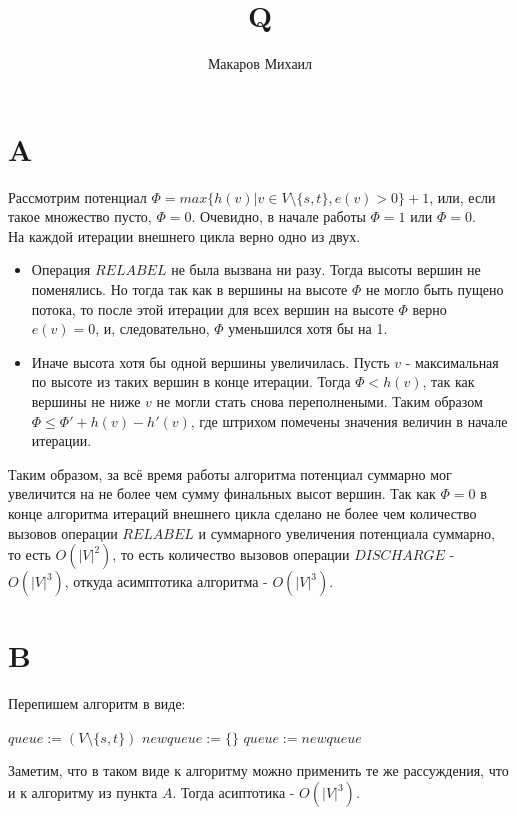 \documentclass{article}
\title{Q}
\author{Макаров Михаил}
\date{}
\begin{document}
	\maketitle
	\section{A}
    Рассмотрим потенциал $\Phi = max \{ h(v)| v \in V \setminus \{ s, t \}, e(v) > 0 \} + 1$, или, если
    такое множество пусто, $\Phi = 0$.
    Очевидно, в начале работы $\Phi = 1$ или $\Phi = 0$.\\
    На каждой итерации внешнего цикла верно одно из двух.
    \begin{itemize}
    \item Операция $RELABEL$ не была вызвана ни разу.
    Тогда высоты вершин не поменялись. Но тогда так как в вершины на высоте $\Phi$ не могло быть пущено потока,
    то после этой итерации для всех вершин на высоте $\Phi$ верно $e(v) = 0$, и, следовательно, 
    $\Phi$ уменьшился хотя бы на 1.
    \item Иначе высота хотя бы одной вершины увеличилась. Пусть $v$ - максимальная по высоте из таких вершин
    в конце итерации. Тогда $\Phi < h(v)$, так как вершины не ниже $v$ не могли стать снова переполнеными.
    Таким образом $\Phi \leq \Phi' + h(v) - h'(v)$, где штрихом помечены значения величин в начале итерации.
    \end{itemize}
    Таким образом, за всё время работы алгоритма потенциал суммарно мог увеличится на не более чем сумму финальных
    высот вершин. Так как $\Phi = 0$ в конце алгоритма итераций внешнего цикла 
    сделано не более чем количество вызовов операции $RELABEL$ и суммарного увеличения 
    потенциала суммарно, то есть $O(|V|^2)$, то есть количество вызовов операции 
    $DISCHARGE$ - $O(|V|^3)$, откуда асимптотика алгоритма - $O(|V|^3)$.
    \section{B}
    Перепишем алгоритм в виде:\\
    \begin{algorithm}[H]
        $queue := (V \setminus \{ s, t \})$\;
         {
            $newqueue := \{ \}$\;
            $queue := newqueue$\;
        }
    \end{algorithm}
    Заметим, что в таком виде к алгоритму можно применить те же рассуждения, что и к
    алгоритму из пункта $A$. Тогда асиптотика - $O(|V|^3)$.
\end{document}
